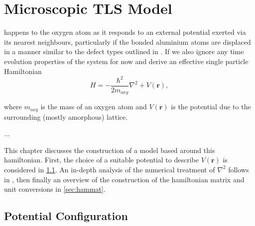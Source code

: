 \versoquote{\raisebox{-1.5em}{\resizebox{!}{2.15em}{}}}{\raisebox{-0.7em}{\resizebox{!}{1.7em}{}}}
\chapter{Microscopic TLS Model}\label{ch:tls}

 happens to the oxygen atom as it responds to an external potential exerted via its nearest neighbours, particularly if the bonded aluminium atoms are displaced in a manner similar to the defect types outlined in .
If we also ignore any time evolution properties of the system for now and derive an effective single particle Hamiltonian
\begin{equation}
    H = -\frac{\hbar^2}{2m_{oxy}}\nabla^2+V(\mathbf{r}),
    \label{eq:OHam}
\end{equation}

where $m_{oxy}$ is the mass of an oxygen atom and $V(\mathbf{r})$ is the potential due to the surrounding (mostly amorphous) lattice.

...

This chapter discusses the construction of a model based around this hamiltonian.
First, the choice of a suitable potential to describe $V(\mathbf{r})$ is considered in \cref{sec:potential}.
An in-depth analysis of the numerical treatment of $\nabla^2$ follows in , then finally an overview of the construction of the hamiltonian matrix and unit conversions in \cref{sec:hammat}.

\section{Potential Configuration}\label{sec:potential}


